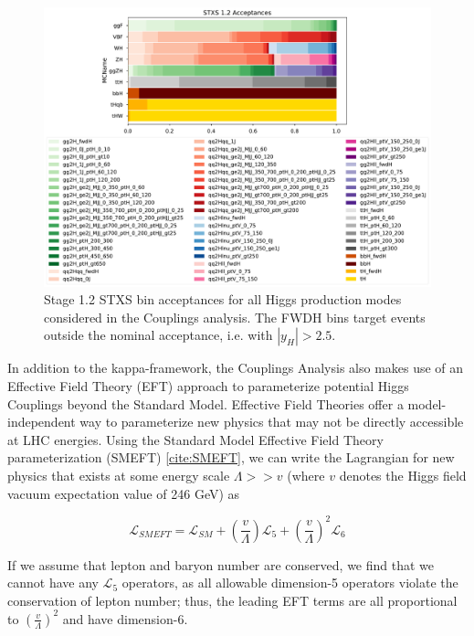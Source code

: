 \begin{figure}[tbp]
        \centering
        \includegraphics[width=\linewidth]{figures/theory_chapter/STXS_acceptances.pdf}
        \caption{Stage 1.2 STXS bin acceptances for all Higgs production modes considered in the Couplings analysis. The FWDH bins target events outside the nominal acceptance, i.e. with $|y_{H}|>2.5$.}
        \label{fig:STXS_acceptances}
\end{figure}

In addition to the kappa-framework, the Couplings Analysis also makes use of an Effective Field Theory (EFT) approach to parameterize potential Higgs Couplings beyond the Standard Model. Effective Field Theories offer a model-independent way to parameterize new physics that may not be directly accessible at LHC energies. Using the Standard Model Effective Field Theory parameterization (SMEFT) \ref{cite:SMEFT}, we can write the Lagrangian for new physics that exists at some energy scale $\Lambda >> v$ (where $v$ denotes the Higgs field vacuum expectation value of 246 GeV) as

\begin{equation}
\mathcal{L}_{SMEFT} = \mathcal{L}_{SM} + (\frac{v}{\Lambda})\mathcal{L}_{5} + (\frac{v}{\Lambda})^2 \mathcal{L}_{6}
\end{equation}

If we assume that lepton and baryon number are conserved, we find that we cannot have any $\mathcal{L}_{5}$ operators, as all allowable dimension-5 operators violate the conservation of lepton number; thus, the leading EFT terms are all proportional to $(\frac{v}{\Lambda})^2$ and have dimension-6.

